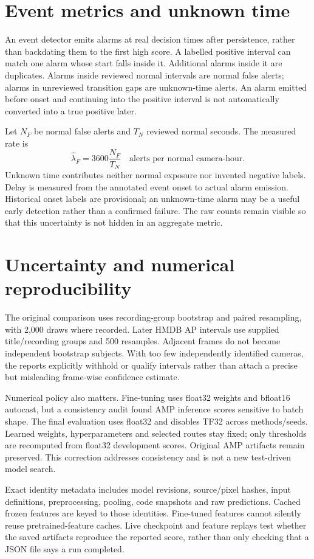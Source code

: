 \section{Event metrics and unknown time}
An event detector emits alarms at real decision times after persistence, rather than backdating them to the first high score. A labelled positive interval can match one alarm whose start falls inside it. Additional alarms inside it are duplicates. Alarms inside reviewed normal intervals are normal false alerts; alarms in unreviewed transition gaps are unknown-time alerts. An alarm emitted before onset and continuing into the positive interval is not automatically converted into a true positive later.

Let $N_F$ be normal false alerts and $T_N$ reviewed normal seconds. The measured rate is
\begin{equation}
\widehat\lambda_F = 3600\frac{N_F}{T_N}\quad\text{alerts per normal camera-hour}.
\end{equation}
Unknown time contributes neither normal exposure nor invented negative labels. Delay is measured from the annotated event onset to actual alarm emission. Historical onset labels are provisional; an unknown-time alarm may be a useful early detection rather than a confirmed failure. The raw counts remain visible so that this uncertainty is not hidden in an aggregate metric.

\section{Uncertainty and numerical reproducibility}
The original comparison uses recording-group bootstrap and paired resampling, with 2,000 draws where recorded. Later HMDB AP intervals use supplied title/recording groups and 500 resamples. Adjacent frames do not become independent bootstrap subjects. With too few independently identified cameras, the reports explicitly withhold or qualify intervals rather than attach a precise but misleading frame-wise confidence estimate.

Numerical policy also matters. Fine-tuning uses float32 weights and bfloat16 autocast, but a consistency audit found AMP inference scores sensitive to batch shape. The final evaluation uses float32 and disables TF32 across methods/seeds. Learned weights, hyperparameters and selected routes stay fixed; only thresholds are recomputed from float32 development scores. Original AMP artifacts remain preserved. This correction addresses consistency and is not a new test-driven model search.

Exact identity metadata includes model revisions, source/pixel hashes, input definitions, preprocessing, pooling, code snapshots and raw predictions. Cached frozen features are keyed to those identities. Fine-tuned features cannot silently reuse pretrained-feature caches. Live checkpoint and feature replays test whether the saved artifacts reproduce the reported score, rather than only checking that a JSON file says a run completed.
